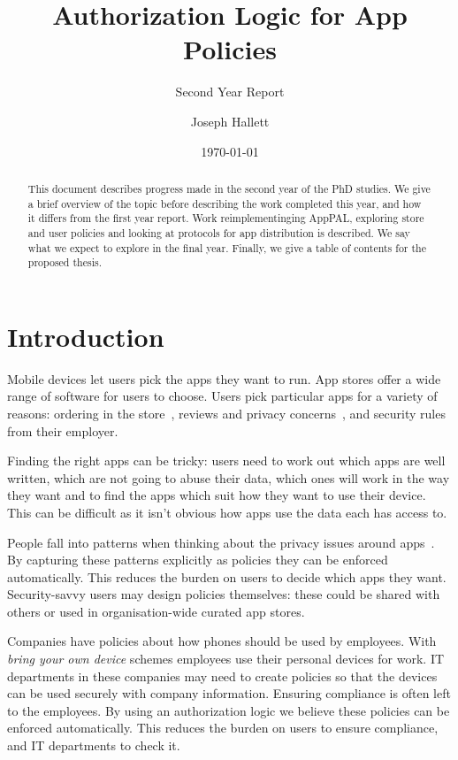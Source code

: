 \documentclass[a4paper]{scrartcl}
\title{Authorization Logic for App Policies}
\subtitle{Second Year Report}
\author{Joseph Hallett}
\date\today
\begin{document}
\maketitle

\begin{abstract}
  This document describes progress made in the second year of the PhD studies.
  We give a brief overview of the topic before describing the work completed this year, and how it differs from the first year report.
  Work reimplementinging AppPAL, exploring store and user policies and looking at protocols for app distribution is described.
  We say what we expect to explore in the final year.
  Finally, we give a table of contents for the proposed thesis.
\end{abstract}

\section{Introduction}

Mobile devices let users pick the apps they want to run.
App stores offer a wide range of software for users to choose.
Users pick particular apps for a variety of reasons:
  ordering in the store~\citep{Prata:2012in},
  reviews and privacy concerns~\citep{Kelley:2013kc},
  and security rules from their employer.

Finding the right apps can be tricky:
  users need to work out which apps are well written, which are not going to abuse their data, which ones will work in the way they want
  and to find the apps which suit how they want to use their device.
This can be difficult as it isn't obvious how apps use the data each has access to.

People fall into patterns when thinking about the privacy issues around apps~\citep{Sadeh:2014vq}.
By capturing these patterns explicitly as policies they can be enforced automatically.
This reduces the burden on users to decide which apps they want.
Security-savvy users may design policies themselves: these could be shared with others or used in organisation-wide curated app stores.

Companies have policies about how phones should be used by employees.
With \emph{bring your own device} schemes employees use their personal devices for work.
IT departments in these companies may need to create policies so that the devices can be used securely with company information.
Ensuring compliance is often left to the employees.
By using an authorization logic we believe these policies can be enforced automatically.
This reduces the burden on users to ensure compliance, and IT departments to check it.
\end{document}
